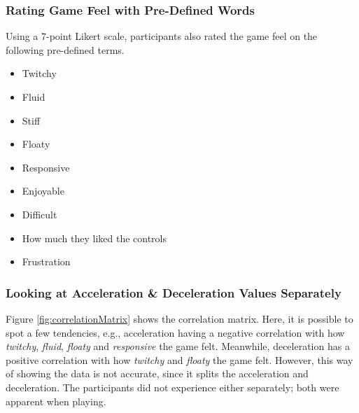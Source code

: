 \subsubsection{Rating Game Feel with Pre-Defined Words}
Using a 7-point Likert scale, participants also rated the game feel on the following pre-defined terms.
\begin{itemize}[noitemsep,nolistsep]
\item Twitchy
\item Fluid
\item Stiff
\item Floaty
\item Responsive
\item Enjoyable
\item Difficult
\item How much they liked the controls
\item Frustration
\end{itemize}

\subsubsection{Looking at Acceleration \& Deceleration Values Separately}
Figure \ref{fig:correlationMatrix} shows the correlation matrix. Here, it is possible to spot a few tendencies, e.g., acceleration having a negative correlation with how \textit{twitchy}, \textit{fluid}, \textit{floaty} and \textit{responsive} the game felt. Meanwhile, deceleration has a positive correlation with how \textit{twitchy} and \textit{floaty} the game felt. However, this way of showing the data is not accurate, since it splits the acceleration and deceleration. The participants did not experience either separately; both were apparent when playing.




